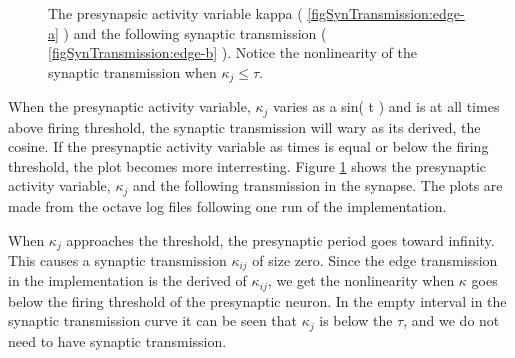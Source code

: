 \begin{figure}[hb!tp]
	\centering
	\label{figSynTransmission}
	\caption{The presynapsic activity variable kappa ( \ref{figSynTransmission:edge-a}  ) and the following synaptic transmission ( \ref{figSynTransmission:edge-b} ). 
			Notice the nonlinearity of the synaptic transmission when $\kappa_j \leq \tau$.}
\end{figure}


			When the presynaptic activity variable, $\kappa_j$ varies as a sin( t ) and is at all times above firing threshold, the synaptic transmission will wary as its derived, the cosine.
			If the presynaptic activity variable as times is equal or below the firing threshold, the plot becomes more interresting.
			Figure \ref{figSynTransmission} shows the presynaptic activity variable, $\kappa_j$ and the following transmission in the synapse. 
			The plots are made from the octave log files following one run of the implementation.

			When $\kappa_j$ approaches the threshold, the presynaptic period goes toward infinity. This causes a synaptic transmission $\kappa_{ij}$ of size zero.
			Since the edge transmission in the implementation is the derived of $\kappa_{ij}$, we get the nonlinearity when $\kappa$ goes below the firing threshold of the presynaptic neuron.
			In the empty interval in the synaptic transmission curve it can be seen that $\kappa_j$ is below the $\tau$, and we do not need to have synaptic transmission.



